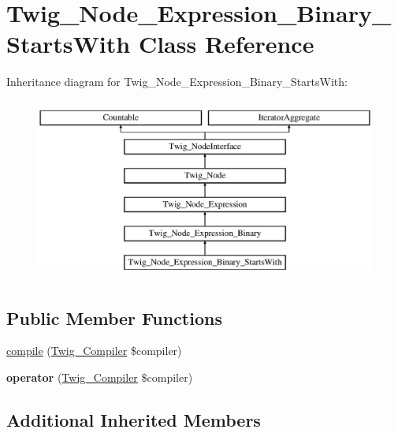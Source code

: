 \hypertarget{classTwig__Node__Expression__Binary__StartsWith}{}\section{Twig\+\_\+\+Node\+\_\+\+Expression\+\_\+\+Binary\+\_\+\+Starts\+With Class Reference}
\label{classTwig__Node__Expression__Binary__StartsWith}
Inheritance diagram for Twig\+\_\+\+Node\+\_\+\+Expression\+\_\+\+Binary\+\_\+\+Starts\+With\+:\begin{figure}[H]
\begin{center}
\leavevmode
\includegraphics[height=6.000000cm]{classTwig__Node__Expression__Binary__StartsWith}
\end{center}
\end{figure}
\subsection*{Public Member Functions}
\begin{DoxyCompactItemize}
\item 
\hyperlink{classTwig__Node__Expression__Binary__StartsWith_af72f112bc06d96159eca5c238d90827b}{compile} (\hyperlink{classTwig__Compiler}{Twig\+\_\+\+Compiler} \$compiler)
\item 
{\bfseries operator} (\hyperlink{classTwig__Compiler}{Twig\+\_\+\+Compiler} \$compiler)\hypertarget{classTwig__Node__Expression__Binary__StartsWith_a57028ae9bab80955119259f77f41c23a}{}\label{classTwig__Node__Expression__Binary__StartsWith_a57028ae9bab80955119259f77f41c23a}

\end{DoxyCompactItemize}
\subsection*{Additional Inherited Members}



